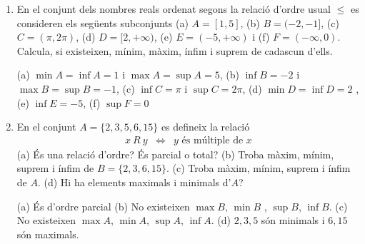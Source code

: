 \begin{enumerate}
\begin{exercici}
\begin{enumerate}
\item[a)] En el conjunt dels nombres naturals $\mathbb{N}$

\item[b)] En el conjunt dels nombres enters $\mathbb{Z}$
\end{enumerate}
\end{exercici}

\begin{indicacio}
(a) És d'ordre parcial, $1$ és minimal i no hi ha
elements maximals. (b) No és d'ordre
\end{indicacio}

\item
\begin{exercici}
En el conjunt dels nombres reals ordenat segons la relació d'ordre
usual $\leq $ es consideren els següents subconjunts (a) $A=[1,5]$, (b) $%
B=(-2,-1]$, (c) $C=(\pi ,2\pi )$, (d) $D=[2,+\infty )$, (e) $E=(-5,+\infty )$
i (f) $F=(-\infty ,0)$. Calcula, si existeixen, mínim, màxim, ínfim i suprem de cadascun d'ells.
\end{exercici}

\begin{indicacio}
(a) $\min A=\inf A=1$ i $\max A=\sup A=5$, (b) $\inf B=-2$ i $
\max B=\sup B=-1$, (c) $\inf C=\pi $ i $\sup C=2\pi $, (d) $\min D=\inf D=2$%
, (e) $\inf E=-5$, (f) $\sup F=0$
\end{indicacio}

\item
\begin{exercici}
En el conjunt $A=\{2,3,5,6,15\}$ es defineix la relació%
\begin{equation*}
\begin{array}{ccc}
x~R~y & \Longleftrightarrow & y\text{ és múltiple de }x%
\end{array}%
\end{equation*}%
(a) És una relació d'ordre? És parcial o total? (b) Troba màxim, mínim, suprem i ínfim de $B=\{2,3,6,15\}$. (c) Troba màxim, mínim, suprem i ínfim de $A$. (d) Hi ha elements maximals i
minimals d'$A$?
\end{exercici}

\begin{indicacio}
(a) És d'ordre parcial (b) No existeixen $\max B$, $\min B$%
, $\sup B$, $\inf B$. (c) No existeixen $\max A$, $\min A$, $\sup A$, $\inf
A $. (d) $2,3,5$ són minimals i $6,15$ són maximals.
\end{indicacio}


\end{enumerate}
